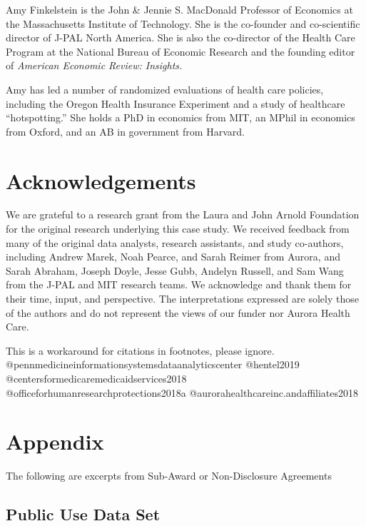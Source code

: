\documentclass[
]{book}
\begin{document}
Amy Finkelstein is the John \& Jennie S. MacDonald Professor of Economics at the Massachusetts Institute of Technology. She is the co-founder and co-scientific director of J-PAL North America. She is also the co-director of the Health Care Program at the National Bureau of Economic Research and the founding editor of \emph{American Economic Review: Insights.}

Amy has led a number of randomized evaluations of health care policies, including the Oregon Health Insurance Experiment and a study of healthcare ``hotspotting.'' She holds a PhD in economics from MIT, an MPhil in economics from Oxford, and an AB in government from Harvard.

\hypertarget{acknowledgements-2}{%
\section*{Acknowledgements}\label{acknowledgements-2}}

We are grateful to a research grant from the Laura and John Arnold Foundation for the original research underlying this case study. We received feedback from many of the original data analysts, research assistants, and study co-authors, including Andrew Marek, Noah Pearce, and Sarah Reimer from Aurora, and Sarah Abraham, Joseph Doyle, Jesse Gubb, Andelyn Russell, and Sam Wang from the J-PAL and MIT research teams. We acknowledge and thank them for their time, input, and perspective. The interpretations expressed are solely those of the authors and do not represent the views of our funder nor Aurora Health Care.

\begin{invisible}
This is a workaround for citations in footnotes, please ignore.
@pennmedicineinformationsystemsdataanalyticscenter @hentel2019
@centersformedicaremedicaidservices2018
@officeforhumanresearchprotections2018a
@aurorahealthcareinc.andaffiliates2018
\end{invisible}

\hypertarget{appendix-4}{%
\section*{Appendix}\label{appendix-4}}

The following are excerpts from Sub-Award or Non-Disclosure Agreements

\hypertarget{public-use-data-set}{%
\subsection*{Public Use Data Set}\label{public-use-data-set}}
\end{document}
